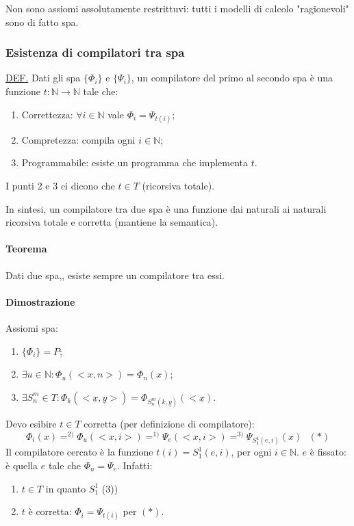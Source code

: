 \documentclass{article}
\begin{document}
Non sono assiomi assolutamente restrittuvi: tutti i modelli di calcolo "ragionevoli" sono di fatto spa.

\subsubsection{Esistenza di compilatori tra spa}
\underline{DEF.} Dati gli spa $\{ \Phi_i \}$ e $\{ \Psi_i \}$, un compilatore del primo al secondo spa è una funzione $t:\mathbb{N}\rightarrow \mathbb{N}$ tale che:
\begin{enumerate}
	\item Correttezza: $\forall i \in \mathbb{N}$ vale $\Phi_i=\Psi_{t(i)}$;
	\item Compretezza: compila ogni $i \in \mathbb{N}$;
	\item Programmabile: esiste un programma che implementa $t$.
\end{enumerate}
I punti 2 e 3 ci dicono che $t \in T$ (ricorsiva totale).



In sintesi, un compilatore tra due spa è una funzione dai naturali ai naturali ricorsiva totale e corretta (mantiene la semantica).
\paragraph{Teorema} Dati due spa,, esiste sempre un compilatore tra essi.

\paragraph{Dimostrazione}
Assiomi spa:
\begin{enumerate}
	\item $\{ \Phi_i \}=P$;
	\item $\exists u \in \mathbb{N}: \Phi_u(<x,n>)=\Phi_n(x)$;
	\item $\exists  S_n^m \in T: \Phi_k(<\underline{x},\underline{y}>)=\Phi_{S_n^m(k,\underline{y})}(<\underline{x})$.
\end{enumerate} 

Devo esibire $t \in T$ corretta (per definizione di compilatore):
\begin{displaymath}
	\Phi_i(x) =^{2)} \Phi_u(<x,i>) =^{1)} \Psi_e(<x,i>) =^{3)} \Psi_{S_1^1(e,i)}(x) \textit{  }(*)
\end{displaymath}
Il compilatore cercato è la funzione $t(i)=S_1^1(e,i)$, per ogni $i \in \mathbb{N}$. $e$ è fissato: è quella $e$ tale che $\Phi_u=\Psi_e$. Infatti:
\begin{enumerate}
	\item $t \in T$ in quanto $S_1^1$ (3))
	\item $t$ è corretta: $\Phi_i=\Psi_{t(i)}$ per $(*)$.
\end{enumerate}
\end{document}
